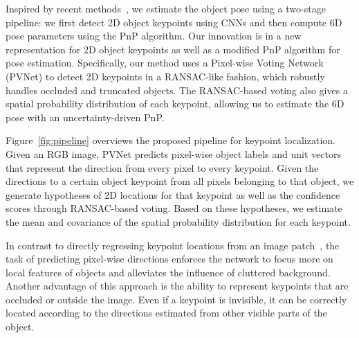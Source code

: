 \documentclass[10pt,twocolumn,letterpaper]{article}
\begin{document}
Inspired by recent methods~\cite{pavlakos20176, rad2017bb8, tekin2018real}, we estimate the object pose using a two-stage pipeline: we first detect 2D object keypoints using CNNs and then compute 6D pose parameters using the PnP algorithm. Our innovation is in a new representation for 2D object keypoints as well as a modified PnP algorithm for pose estimation. Specifically, our method uses a Pixel-wise Voting Network (PVNet) to detect 2D keypoints in a RANSAC-like fashion, which robustly handles occluded and truncated objects. The RANSAC-based voting also gives a spatial probability distribution of each keypoint, allowing us to estimate the 6D pose with an uncertainty-driven PnP.


Figure~\ref{fig:pipeline} overviews the proposed pipeline for keypoint localization. Given an RGB image, PVNet predicts pixel-wise object labels and unit vectors that represent the direction from every pixel to every keypoint. Given the directions to a certain object keypoint from all pixels belonging to that object, we generate hypotheses of 2D locations for that keypoint as well as the confidence scores through RANSAC-based voting. Based on these hypotheses, we estimate the mean and covariance of the spatial probability distribution for each keypoint.

In contrast to directly regressing keypoint locations from an image patch~\cite{rad2017bb8, tekin2018real}, the task of predicting pixel-wise directions enforces the network to focus more on local features of objects and alleviates the influence of cluttered background. Another advantage of this approach is the ability to represent keypoints that are occluded or outside the image. Even if a keypoint is invisible, it can be correctly located according to the directions estimated from other visible parts of the object.
\end{document}
